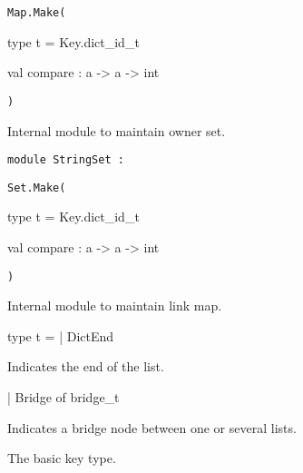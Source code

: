 \documentclass[11pt]{article}
\begin{document}
{\tt{Map.Make}}{\tt{(}}\begin{ocamldocsigend}


\label{type:Key.StringMap.t}\begin{ocamldoccode}
type t = Key.dict_id_t 
\end{ocamldoccode}


\label{val:Key.StringMap.compare}\begin{ocamldoccode}
val compare : {\textquotesingle}a -> {\textquotesingle}a -> int
\end{ocamldoccode}
\end{ocamldocsigend}
{\tt{)}}

\begin{ocamldocdescription}
Internal module to maintain owner set.


\end{ocamldocdescription}




\begin{ocamldoccode}
{\tt{module }}{\tt{StringSet}}{\tt{ : }}\end{ocamldoccode}
\label{module:Key.StringSet}

{\tt{Set.Make}}{\tt{(}}\begin{ocamldocsigend}


\label{type:Key.StringSet.t}\begin{ocamldoccode}
type t = Key.dict_id_t 
\end{ocamldoccode}


\label{val:Key.StringSet.compare}\begin{ocamldoccode}
val compare : {\textquotesingle}a -> {\textquotesingle}a -> int
\end{ocamldoccode}
\end{ocamldocsigend}
{\tt{)}}

\begin{ocamldocdescription}
Internal module to maintain link map.


\end{ocamldocdescription}




\label{type:Key.t}\begin{ocamldoccode}
type t =
  | DictEnd
\end{ocamldoccode}
\begin{ocamldoccomment}
Indicates the end of the list.
\end{ocamldoccomment}
\begin{ocamldoccode}
  | Bridge of bridge_t
\end{ocamldoccode}
\begin{ocamldoccomment}
Indicates a bridge node between
              one or several lists.
\end{ocamldoccomment}
\begin{ocamldocdescription}
The basic key type.


\end{ocamldocdescription}
\end{document}
